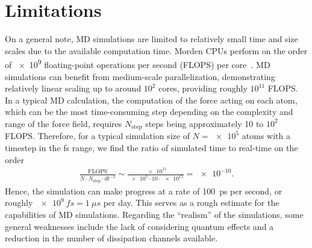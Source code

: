 




\section{Limitations}
On a general note, \acrshort{MD} simulations are limited to relatively small
time and size scales due to the available computation time. Morden CPUs perform
on the order of \num{e9} floating-point operations per second (FLOPS) per core~\cite{Vanossi_2013}. \acrshort{MD} simulations can benefit from medium-scale
parallelization, demonstrating relatively linear scaling up to around $10^2$
cores, providing roughly $10^{11}$ FLOPS. In a typical \acrshort{MD} calculation, the computation of the force acting on each atom, which can be the most time-consuming step depending on the complexity and range of the force field, requires $N_{\text{step}}$ steps being approximately 10 to $10^2$ FLOPS. Therefore, for a typical simulation size of $N = \num{e5}$ atoms with a timestep in the fs range, we find the ratio of simulated time to real-time on the order 
\begin{align*}
  \frac{\text{FLOPS}}{N\cdot N_{\text{step}} \cdot dt^{-1}} \sim \frac{\num{e11}}{\num{e5}\cdot 10 \cdot \num{e15}} = \num{e-10}.
\end{align*}
Hence, the simulation can make progress at a rate of \SI{100}{ps} per second, or roughly $\SI{e9}{fs}=\SI{1}{\mu s}$ per day. This serves as a rough estimate for the capabilities of \acrshort{MD} simulations. Regarding the ``realism'' of the simulations, some general weaknesses include the lack of considering quantum effects and a reduction in the number of dissipation channels available.


